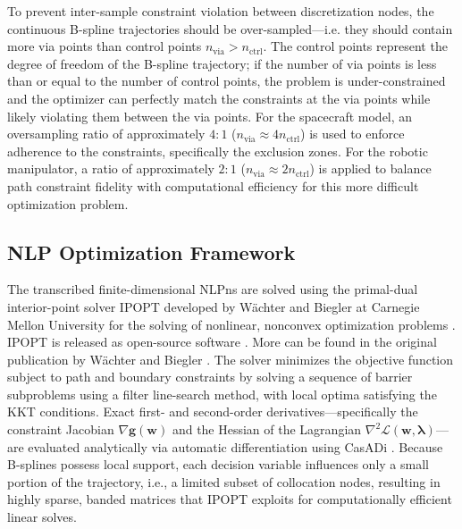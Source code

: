 To prevent inter-sample constraint violation between discretization nodes, the continuous B-spline trajectories should be over-sampled---i.e. they should contain more via points than control points $n_{\mathrm{via}} > n_{\mathrm{ctrl}}$. 
The control points represent the degree of freedom of the B-spline trajectory; 
if the number of via points is less than or equal to the number of control points, the problem is under-constrained and the optimizer can perfectly match the constraints at the via points while likely violating them between the via points.
For the spacecraft model, an oversampling ratio of approximately $4:1$ ($n_{\mathrm{via}} \approx 4 n_{\mathrm{ctrl}}$) is used to enforce adherence to the constraints, specifically the exclusion zones. 
For the robotic manipulator, a ratio of approximately $2:1$ ($n_{\mathrm{via}} \approx 2 n_{\mathrm{ctrl}}$) is applied to balance path constraint fidelity with computational efficiency for this more difficult optimization problem.


\subsection{NLP Optimization Framework}
\label{sec:nlp_solver_framework}

The transcribed finite-dimensional \acp{NLPn} are solved using the primal-dual interior-point solver \ac{IPOPT} developed by Wächter and Biegler at Carnegie Mellon University for the solving of nonlinear, nonconvex optimization problems \cite{Waechter06}. 
\ac{IPOPT} is released as open-source software \cite{Waechter06}.
More can be found in the original publication by Wächter and Biegler \cite{Waechter06}.
The solver minimizes the objective function subject to path and boundary constraints by solving a sequence of barrier subproblems using a filter line-search method, with local optima satisfying the \ac{KKT} conditions. 
Exact first- and second-order derivatives—specifically the constraint Jacobian $\nabla \mathbf{g}(\mathbf{w})$ and the Hessian of the Lagrangian $\nabla^2 \mathcal{L}(\mathbf{w}, \boldsymbol{\lambda})$—are evaluated analytically via automatic differentiation using \ac{CasADi} \cite{Andersson19}. 
Because B-splines possess local support, each decision variable influences only a small portion of the trajectory, i.e., a limited subset of collocation nodes, resulting in highly sparse, banded matrices that \ac{IPOPT} exploits for computationally efficient linear solves.

